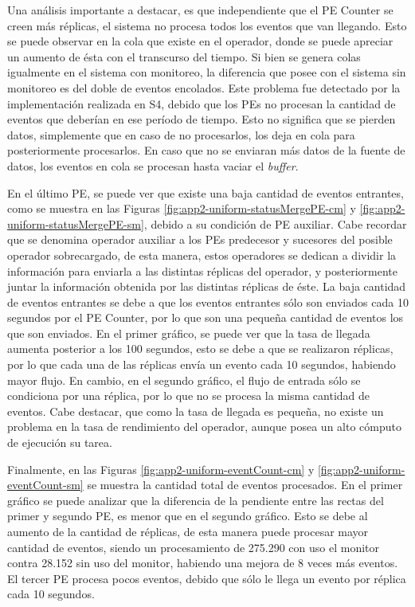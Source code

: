 Una análisis importante a destacar, es que independiente que el PE Counter se creen más réplicas, el sistema no procesa todos los eventos que van llegando. Esto se puede observar en la cola que existe en el operador, donde se puede apreciar un aumento de ésta con el transcurso del tiempo. Si bien se genera colas igualmente en el sistema con monitoreo, la diferencia que posee con el sistema sin monitoreo es del doble de eventos encolados. Este problema fue detectado por la implementación realizada en S4, debido que los PEs no procesan la cantidad de eventos que deberían en ese período de tiempo. Esto no significa que se pierden datos, simplemente que en caso de no procesarlos, los deja en cola para posteriormente procesarlos. En caso que no se enviaran más datos de la fuente de datos, los eventos en cola se procesan hasta vaciar el \textit{buffer}.

En el último PE, se puede ver que existe una baja cantidad de eventos entrantes, como se muestra en las Figuras \ref{fig:app2-uniform-statusMergePE-cm} y \ref{fig:app2-uniform-statusMergePE-sm}, debido a su condición de PE auxiliar. Cabe recordar que se denomina operador auxiliar a los PEs predecesor y sucesores del posible operador sobrecargado, de esta manera, estos operadores se dedican a dividir la información para enviarla a las distintas réplicas del operador, y posteriormente juntar la información obtenida por las distintas réplicas de éste. La baja cantidad de eventos entrantes se debe a que los eventos entrantes sólo son enviados cada 10 segundos por el PE Counter, por lo que son una pequeña cantidad de eventos los que son enviados. En el primer gráfico, se puede ver que la tasa de llegada aumenta posterior a los 100 segundos, esto se debe a que se realizaron réplicas, por lo que cada una de las réplicas envía un evento cada 10 segundos, habiendo mayor flujo. En cambio, en el segundo gráfico, el flujo de entrada sólo se condiciona por una réplica, por lo que no se procesa la misma cantidad de eventos. Cabe destacar, que como la tasa de llegada es pequeña, no existe un problema en la tasa de rendimiento del operador, aunque posea un alto cómputo de ejecución su tarea.

Finalmente, en las Figuras \ref{fig:app2-uniform-eventCount-cm} y \ref{fig:app2-uniform-eventCount-sm} se muestra la cantidad total de eventos procesados. En el primer gráfico se puede analizar que la diferencia de la pendiente entre las rectas del primer y segundo PE, es menor que en el segundo gráfico. Esto se debe al aumento de la cantidad de réplicas, de esta manera puede procesar mayor cantidad de eventos, siendo un procesamiento de 275.290 con uso el monitor contra 28.152 sin uso del monitor, habiendo una mejora de 8 veces más eventos. El tercer PE procesa pocos eventos, debido que sólo le llega un evento por réplica cada 10 segundos.


